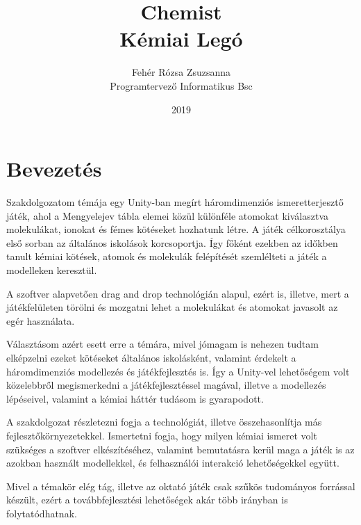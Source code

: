 \documentclass[colorlinks]{thesis-ekf}
\theoremstyle{definition}
\theoremstyle{remark}
\begin{document}
\title{Chemist \\ Kémiai Legó}
\author{Fehér Rózsa Zsuzsanna\\ Programtervező Informatikus Bsc}

\date{2019}
\maketitle
\tableofcontents

\chapter{Bevezetés}
Szakdolgozatom témája egy Unity-ban megírt háromdimenziós ismeretterjesztő játék, ahol a Mengyelejev tábla elemei közül különféle atomokat kiválasztva molekulákat, ionokat és fémes kötéseket hozhatunk létre.
A játék célkorosztálya első sorban az általános iskolások korcsoportja. Így főként ezekben az időkben tanult kémiai kötések, atomok és molekulák felépítését szemlélteti a játék a modelleken keresztül.

A szoftver alapvetően drag and drop technológián alapul, ezért is, illetve, mert a játékfelületen törölni és mozgatni lehet a molekulákat és atomokat javasolt az egér használata.

Választásom azért esett erre a témára, mivel jómagam is nehezen tudtam elképzelni ezeket kötéseket általános iskolásként, valamint érdekelt a háromdimenziós modellezés és játékfejlesztés is. Így a Unity-vel lehetőségem volt közelebbről megismerkedni a játékfejlesztéssel magával, illetve a modellezés lépéseivel, valamint a kémiai háttér tudásom is gyarapodott.

A szakdolgozat részletezni fogja a technológiát, illetve összehasonlítja más fejlesztőkörnyezetekkel. Ismertetni fogja, hogy milyen kémiai ismeret volt szükséges a szoftver elkészítéséhez, valamint bemutatásra kerül maga a játék is az azokban használt modellekkel, és felhasználói interakció lehetőségekkel együtt. 

Mivel a témakör elég tág, illetve az oktató játék csak szűkös tudományos forrással készült, ezért a továbbfejlesztési lehetőségek akár több irányban is folytatódhatnak.
\end{document}
